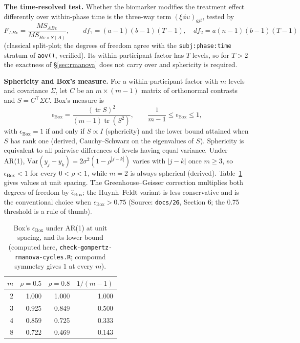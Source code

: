 \documentclass[11pt]{article}
\newcommand{\code}[1]{\texttt{#1}}
\begin{document}
\textbf{The time-resolved test.} Whether the biomarker modifies the
treatment effect differently over within-phase time is the three-way
term $(\xi\phi\upsilon)_{gjt}$, tested by
\begin{equation}
F_{AB\upsilon} = \frac{MS_{AB\upsilon}}{MS_{B\upsilon\times S(A)}}, \qquad
df_1 = (a-1)(b-1)(T-1), \quad df_2 = a(n-1)(b-1)(T-1)
\label{eq:invb-fabt}
\end{equation}
(classical split-plot; the degrees of freedom agree with the
\code{subj:phase:time} stratum of \code{aov()}, verified). Its
within-participant factor has $T$ levels, so for $T > 2$ the exactness
of \S\ref{sec:rmanova} does not carry over and sphericity is required.

\textbf{Sphericity and Box's measure.} For a within-participant factor
with $m$ levels and covariance $\Sigma$, let $C$ be an $m \times (m-1)$
matrix of orthonormal contrasts and $S = C^\top \Sigma C$. Box's
measure is
\begin{equation}
\epsilon_{\mathrm{Box}} = \frac{(\operatorname{tr} S)^2}
  {(m-1)\operatorname{tr}(S^2)}, \qquad
  \frac{1}{m-1} \le \epsilon_{\mathrm{Box}} \le 1,
\label{eq:invb-box}
\end{equation}
with $\epsilon_{\mathrm{Box}} = 1$ if and only if $S \propto I$
(sphericity) and the lower bound attained when $S$ has rank one
(derived, Cauchy--Schwarz on the eigenvalues of $S$). Sphericity is
equivalent to all pairwise differences of levels having equal
variance. Under AR(1), $\mathrm{Var}(y_j - y_k) = 2\sigma^2(1 -
\rho^{|j-k|})$ varies with $|j - k|$ once $m \ge 3$, so
$\epsilon_{\mathrm{Box}} < 1$ for every $0 < \rho < 1$, while $m = 2$
is always spherical (derived). Table~\ref{tab:invb-box} gives values at
unit spacing. The Greenhouse--Geisser correction multiplies both
degrees of freedom by $\hat\epsilon_{\mathrm{Box}}$; the Huynh--Feldt
variant is less conservative and is the conventional choice when
$\hat\epsilon_{\mathrm{Box}} > 0.75$ (Source: \code{docs/26},
Section 6; the 0.75 threshold is a rule of thumb).

\begin{table}[h]
\centering\small
\caption{Box's $\epsilon_{\mathrm{Box}}$ under AR(1) at unit spacing,
and its lower bound (computed here, \code{check-gompertz-rmanova-cycles.R}; compound
symmetry gives 1 at every $m$).}
\label{tab:invb-box}
\begin{tabular}{@{}rrrr@{}}
\toprule
$m$ & $\rho = 0.5$ & $\rho = 0.8$ & $1/(m-1)$ \\
\midrule
2 & 1.000 & 1.000 & 1.000 \\
3 & 0.925 & 0.849 & 0.500 \\
4 & 0.859 & 0.725 & 0.333 \\
8 & 0.722 & 0.469 & 0.143 \\
\bottomrule
\end{tabular}
\end{table}
\end{document}
